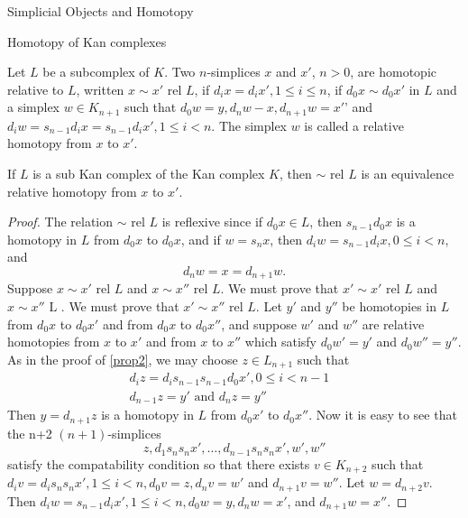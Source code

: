 \documentclass[a4,20pt,twosides]{book}
\begin{document}
\begin{chapter}{Simplicial Objects and Homotopy}
\begin{section}{Homotopy of Kan complexes}
\begin{chdefn}
	Let $L$ be a subcomplex of $K$. Two $n$-simplices $x$ and $x'$, $n>0$, are homotopic relative to $L$, written $x \sim x'\text{ rel } L$, if $d_i x = d_i x', 1 \leq i \leq n$, if $d_0 x \sim d_0 x'$ in $L$ and a simplex $w \in K_{n+1}$ such that $d_0 w = y, d_n w - x, d_{n+1}w =x'$' and $d_i w = s_{n-1} d_i x = s_{n-1} d_i x', 1\leq i < n$. The simplex $w$ is called a relative homotopy from $x$ to $x'$.
\end{chdefn}

\begin{chprop}
	If $L$ is a sub Kan complex of the Kan complex $K$, then $\sim \text{ rel } L$ is an equivalence relative homotopy from $x$ to $x'$.
\end{chprop}
\begin{proof}
	The relation $ \sim \text{ rel }L$ is reflexive since if $d_0  x \in L$, then $s_{n-1} d_0 x$ is a homotopy in $L$ from $d_0 x $ to $d_0 x$, and if $w= s_n x$, then $d_i w = s_{n-1} d_i x, 0 \leq i <n$, and 
	\[
	d_n w =x= d_{n+1}w.
	\]
	Suppose $x \sim x' \text{ rel }L$ and $x \sim x'' \text{ rel }L$. We must prove that $x' \sim x' \text{ rel } L$ and $x \sim x'' \text{ L }$. We must prove that $x' \sim x'' \text{ rel } L$. Let $y'$ and $y''$ be homotopies in $L$ from $d_0 x$ to $d_0 x'$ and from $d_0 x $ to $d_0 x''$, and suppose $w'$ and $w''$ are relative homotopies from $x$ to $x'$ and from $x$ to $x''$ which satisfy $d_0 w' = y'$ and $d_0 w'' =y''$. As in the proof of \ref{prop2}, we may choose $z \in L_{n+1}$ such that 
	\begin{align*}
	d_i z = d_i s_{n-1} s_{n-1} d_0 x', 0 \leq i < n-1&\\
	d_{n-1} z = y' \text{ and } d_n z = y''&
	\end{align*}
	Then $y= d_{n+1} z$ is a homotopy in $L$ from $d_0 x'$ to $d_0 x''$. Now it is easy to see that the n+2 $(n+1)$-simplices
	\[
	z, d_1 s_n s_n x', \dots , d_{n-1} s_n s_n x', w',w''
	\]
	satisfy the compatability condition so that there exists $v \in K_{n+2}$ such that $d_i v = d_i s_n s_n x', 1 \leq i < n, d_0 v =z, d_n v =w'$ and $d_{n+1} v = w''$. Let $w = d_{n+2} v$. Then $d_i w = s_{n-1} d_i x', 1 \leq i <n, d_0 w = y, d_n w = x' $, and $d_{n+1} w = x''$.
	\end{proof}
	

\end{section}
\end{chapter}
\end{document}
